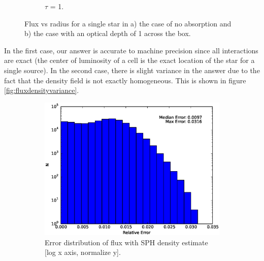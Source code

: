 \begin{figure}
\begin{subfigure}[b]{0.45\textwidth}
                \caption{$\tau$ = 1.}
                \label{fig:singlestarthick}
        \end{subfigure}
        \caption[Flux for a single star]{Flux vs radius for a single star in a) the case of no absorption and b) the case with an optical depth of 1 across the box.}
        \label{fig:singlestarflux}
\end{figure}

In the first case, our answer is accurate to machine precision since all interactions are exact (the center of luminosity of a cell is the exact location of the star for a single source). In the second case, there is slight variance in the answer due to the fact that the density field is not exactly homogeneous. This is shown in figure \ref{fig:fluxdensityvariance}.

\begin{figure}
        \centering
        \begin{subfigure}[b]{0.45\textwidth}
                \includegraphics[width=\textwidth]{graphics/errorNorm.eps}
                \caption{Error distribution of flux with SPH density estimate [log x axis, normalize y].}
                \label{fig:fluxerrorsingle}
        \end{subfigure}
        ~ 
        \begin{subfigure}[b]{0.45\textwidth}

\end{subfigure}
\end{figure}

